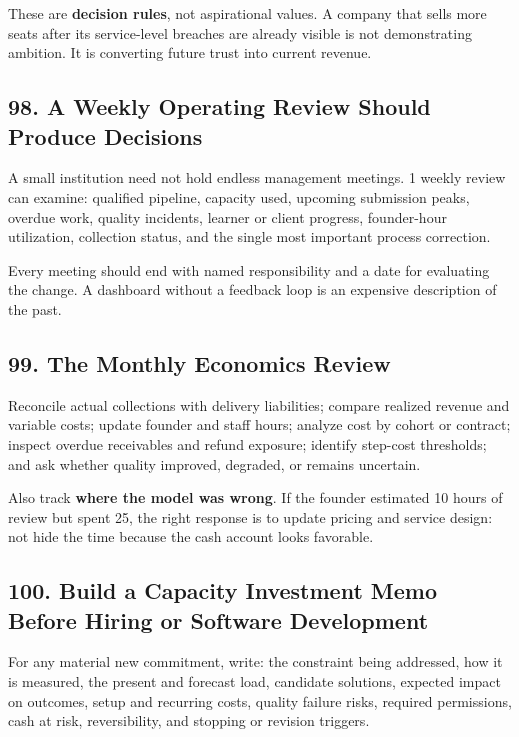 These are \textbf{decision rules}, not aspirational values. A company that sells more seats after its service-level breaches are already visible is not demonstrating ambition. It is converting future trust into current revenue.

\subsection*{98. A Weekly Operating Review Should Produce Decisions}

A small institution need not hold endless management meetings. 1 weekly review can examine: qualified pipeline, capacity used, upcoming submission peaks, overdue work, quality incidents, learner or client progress, founder-hour utilization, collection status, and the single most important process correction.

Every meeting should end with named responsibility and a date for evaluating the change. A dashboard without a feedback loop is an expensive description of the past.

\subsection*{99. The Monthly Economics Review}

Reconcile actual collections with delivery liabilities; compare realized revenue and variable costs; update founder and staff hours; analyze cost by cohort or contract; inspect overdue receivables and refund exposure; identify step-cost thresholds; and ask whether quality improved, degraded, or remains uncertain.

Also track \textbf{where the model was wrong}. If the founder estimated 10 hours of review but spent 25, the right response is to update pricing and service design: not hide the time because the cash account looks favorable.

\subsection*{100. Build a Capacity Investment Memo Before Hiring or Software Development}

For any material new commitment, write: the constraint being addressed, how it is measured, the present and forecast load, candidate solutions, expected impact on outcomes, setup and recurring costs, quality failure risks, required permissions, cash at risk, reversibility, and stopping or revision triggers.

